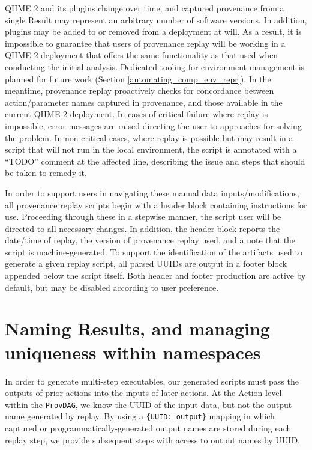 QIIME 2 and its plugins change over time, and captured provenance from a single
Result may represent an arbitrary number of software versions. In addition,
plugins may be added to or removed from a deployment at will. As a result, it is
impossible to guarantee that users of provenance replay will be working in a
QIIME 2 deployment that offers the same functionality as that used when
conducting the initial analysis. Dedicated tooling for environment management is
planned for future work (Section \ref{automating_comp_env_repr}). In the
meantime, provenance replay proactively checks for concordance between
action/parameter names captured in provenance, and those available in the
current QIIME 2 deployment. In cases of critical failure where replay is
impossible, error messages are raised directing the user to approaches for
solving the problem. In non-critical cases, where replay is possible but may
result in a script that will not run in the local environment, the script is
annotated with a “TODO” comment at the affected line, describing the issue and
steps that should be taken to remedy it.

In order to support users in navigating these manual data inputs/modifications,
all provenance replay scripts begin with a header block containing instructions
for use. Proceeding through these in a stepwise manner, the script user will be
directed to all necessary changes. In addition, the header block reports the
date/time of replay, the version of provenance replay used, and a note that the
script is machine-generated. To support the identification of the artifacts used
to generate a given replay script, all parsed UUIDs are output in a footer block
appended below the script itself. Both header and footer production are active
by default, but may be disabled according to user preference.


\section{Naming Results, and managing uniqueness within namespaces}

In order to generate multi-step executables, our generated scripts must pass the
outputs of prior actions into the inputs of later actions. At the Action level
within the \texttt{ProvDAG}, we know the UUID of the input data, but not the output name
generated by replay. By using a \texttt{\{UUID: output\}} mapping in which captured or
programmatically-generated output names are stored during each replay step, we
provide subsequent steps with access to output names by UUID.

